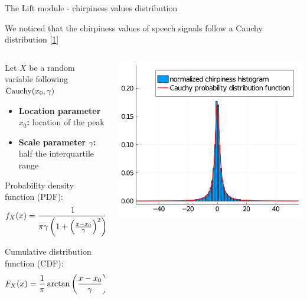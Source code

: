 \documentclass[10pt,american,ignorenonframetext,aspectratio=1610]{beamer}
\providecommand{\tightlist}{%
  \setlength{\itemsep}{0pt}\setlength{\parskip}{0pt}}
\theoremstyle{remark}
\begin{document}
\begin{frame}{The Lift module - chirpiness values distribution}
\protect\hypertarget{the-lift-module---chirpiness-values-distribution}{}

We noticed that the chirpiness values of speech signals follow a Cauchy
distribution {[}\protect\hyperlink{ref-asswad2021}{1}{]}

\begin{columns}[T]
\begin{column}{0.6\textwidth}
Let \(X\) be a random variable following \(\mathrm{Cauchy}(x_0, \gamma)\)

\begin{itemize}
\tightlist
\item
  \textbf{Location parameter \(x_0\):} location of the peak
\item
  \textbf{Scale parameter \(\gamma\):} half the interquartile range
\end{itemize}

Probability density function (PDF):
\[f_X(x)=\frac{1}{\pi\gamma\left(1+\left(\frac{x-x_0}{\gamma}\right)^2\right)}\]

Cumulative distribution function (CDF):
\[F_X(x)=\frac{1}{\pi} \arctan\left(\frac{x-x_0}{\gamma}\right) + \frac{1}{2}\]
\end{column}

\begin{column}{0.4\textwidth}
\includegraphics{img/cauchy_dist_pdf.png}
\end{column}
\end{columns}

\end{frame}
\end{document}
